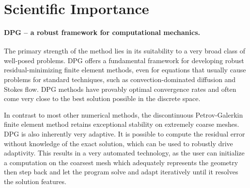 \documentclass[letterpaper,12pt]{article}
\begin{document}
\section*{Scientific Importance}
\paragraph{DPG -- a robust framework for computational mechanics.}
The primary strength of the method lies in its suitability to a very broad class of well-posed problems.
DPG offers a fundamental framework for developing robust residual-minimizing finite element methods, even for equations that usually cause problems
for standard techniques, such as convection-dominated diffusion and Stokes flow.
DPG methods have provably optimal convergence rates and often come very close to the best solution possible in the discrete space.

In contrast to most other numerical methods, the discontinuous Petrov-Galerkin finite element method retains exceptional stability on extremely coarse meshes.
DPG is also inherently very adaptive.
It is possible to compute the residual error without knowledge of the exact solution, which can be used to robustly drive adaptivity.
This results in a very automated technology, as the user can initialize a computation on the coarsest mesh which adequately represents the geometry 
then step back and let the program solve and adapt iteratively until it resolves the solution features.
\end{document}
